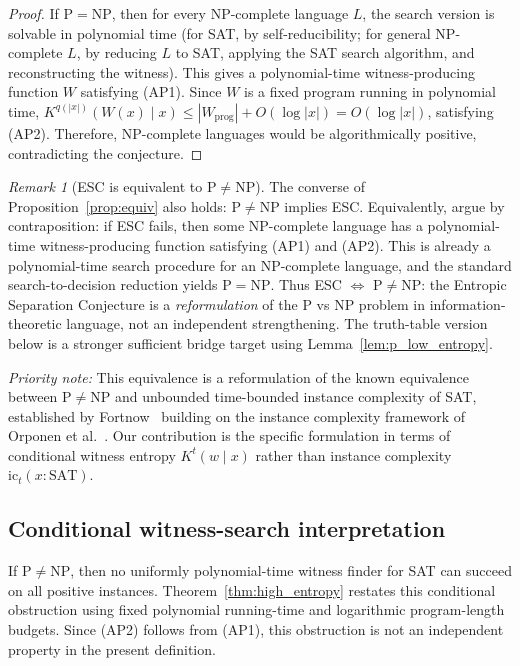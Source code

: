\documentclass[aps,prd,twocolumn,superscriptaddress,nofootinbib]{revtex4-2}
\theoremstyle{definition}
\theoremstyle{remark}
\newtheorem{remark}[theorem]{Remark}
\newcommand{\NP}{\mathrm{NP}}
\newcommand{\PP}{\mathrm{P}}
\begin{document}
\begin{proof}
If $\PP = \NP$, then for every NP-complete language $L$, the search version is solvable in polynomial time (for SAT, by self-reducibility; for general NP-complete $L$, by reducing $L$ to SAT, applying the SAT search algorithm, and reconstructing the witness). This gives a polynomial-time witness-producing function $W$ satisfying (AP1). Since $W$ is a fixed program running in polynomial time, $K^{q(|x|)}(W(x) \mid x) \leq |W_{\text{prog}}| + O(\log|x|) = O(\log|x|)$, satisfying (AP2). Therefore, NP-complete languages would be algorithmically positive, contradicting the conjecture.
\end{proof}

\begin{remark}[ESC is equivalent to $\PP \neq \NP$]
\label{rem:esc-equivalence}
The converse of Proposition~\ref{prop:equiv} also holds: $\PP \neq \NP$ implies ESC. Equivalently, argue by contraposition: if ESC fails, then some NP-complete language has a polynomial-time witness-producing function satisfying (AP1) and (AP2). This is already a polynomial-time search procedure for an NP-complete language, and the standard search-to-decision reduction yields $\PP=\NP$. Thus ESC $\Leftrightarrow$ $\PP \neq \NP$: the Entropic Separation Conjecture is a \textit{reformulation} of the P vs NP problem in information-theoretic language, not an independent strengthening. The truth-table version below is a stronger sufficient bridge target using Lemma~\ref{lem:p_low_entropy}.

\textit{Priority note:} This equivalence is a reformulation of the known equivalence between $\PP \neq \NP$ and unbounded time-bounded instance complexity of SAT, established by Fortnow~\cite{Fortnow2000} building on the instance complexity framework of Orponen et al.~\cite{OrponenKoSchoeningWatanabe1994}. Our contribution is the specific formulation in terms of conditional witness entropy $K^t(w \mid x)$ rather than instance complexity $\mathrm{ic}_t(x : \mathrm{SAT})$.
\end{remark}

\subsection{Conditional witness-search interpretation}
If $\PP\ne\NP$, then no uniformly polynomial-time
witness finder for SAT can succeed on all positive instances.
Theorem~\ref{thm:high_entropy} restates this conditional
obstruction using fixed polynomial running-time and logarithmic
program-length budgets. Since (AP2) follows from (AP1), this
obstruction is not an independent property in the present definition.
\end{document}
